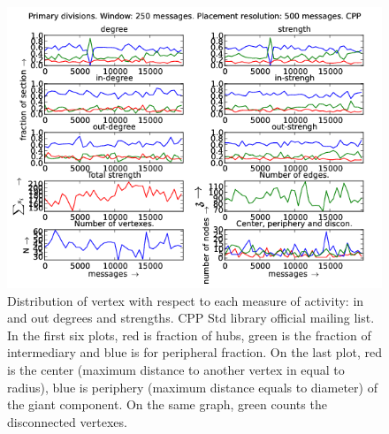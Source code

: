 \documentclass[%
 aip,
 jmp,%
 amsmath,amssymb,
 reprint,%
]{revtex4-1}
\begin{document}
\begin{figure}[hbtp] 
   \centering
        \includegraphics[width=\textwidth]{figs/CPP/250}
    \caption{Distribution of vertex with respect to each measure of activity: in and out degrees and strengths. CPP Std library official mailing list. In the first six plots, red is fraction of hubs, green is the fraction of intermediary and blue is for peripheral fraction. On the last plot, red is the center (maximum distance to another vertex in equal to radius), blue is periphery (maximum distance equals to diameter) of the giant component. On the same graph, green counts the disconnected vertexes.}
    \label{fig:cpp250}
\end{figure}
\end{document}

